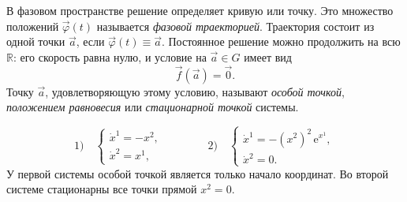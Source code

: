 \documentclass[12pt,a4paper]{article}
\numberwithin{equation}{section}
\newcommand{\R}{\mathbb{R}}
\newcommand{\vect}[1]{\vec{#1}}
\newcommand{\e}{\mathrm{e}}
\begin{document}
\begin{center}
\end{center}

\begin{definitionHSE}
В фазовом пространстве решение определяет кривую или точку.
Это множество положений $\vect\varphi(t)$ называется
\textit{фазовой траекторией}.
Траектория состоит из одной точки $\vect a$, если
$\vect\varphi(t)\equiv\vect a$. Постоянное решение можно продолжить на всю $\R$:
его скорость равна нулю, и условие на $\vect a\in G$ имеет вид
\[
 \vect f(\vect a)=\vect 0.
\]
Точку $\vect a$, удовлетворяющую этому условию, называют
\textit{особой точкой}, \textit{положением равновесия} или
\textit{стационарной точкой} системы.
\end{definitionHSE}

\begin{exampleHSE}
\[
 \text{1)}\quad
 \begin{cases}
 \dot{x}^1=-x^2,\\ \dot{x}^2=x^1,
 \end{cases}
 \qquad\qquad
 \text{2)}\quad
 \begin{cases}
 \dot{x}^1=-(x^2)^2\,\e^{x^1},\\ \dot{x}^2=0.
 \end{cases}
\]
У первой системы особой точкой является только начало координат.
Во второй системе стационарны все точки прямой $x^2=0$.
\end{exampleHSE}
\end{document}
